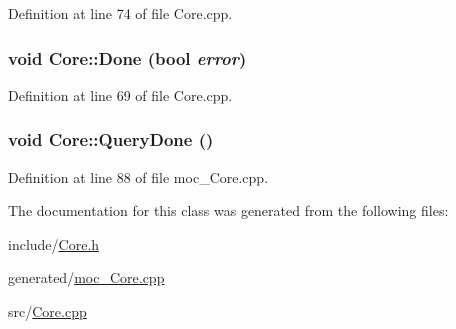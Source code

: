 Definition at line 74 of file Core.cpp.\hypertarget{classCore_299d2e5e288da339e11f30500f473b16}{
\subsubsection{\setlength{\rightskip}{0pt plus 5cm}void Core::Done (bool {\em error})}}
\label{classCore_299d2e5e288da339e11f30500f473b16}




Definition at line 69 of file Core.cpp.\hypertarget{classCore_c74c19f85f549851d3d7afd7e449770b}{
\subsubsection{\setlength{\rightskip}{0pt plus 5cm}void Core::QueryDone ()}}
\label{classCore_c74c19f85f549851d3d7afd7e449770b}




Definition at line 88 of file moc\_\-Core.cpp.

The documentation for this class was generated from the following files:\begin{CompactItemize}
\item 
include/\hyperlink{Core_8h}{Core.h}\item 
generated/\hyperlink{moc__Core_8cpp}{moc\_\-Core.cpp}\item 
src/\hyperlink{Core_8cpp}{Core.cpp}\end{CompactItemize}
